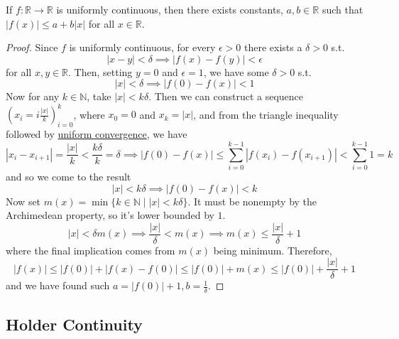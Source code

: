   \begin{theorem}
    \label{thm:uniformly-continuous-function-is-linearly}
    If $f: \mathbb{R} \to \mathbb{R}$ is uniformly continuous, then there exists constants, $a, b \in \mathbb{R}$ such that $|f(x)| \leq a + b|x|$ for all $x \in \mathbb{R}$. 
  \end{theorem}
  \begin{proof}
    Since $f$ is uniformly continuous, for every $\epsilon > 0$ there exists a $\delta > 0$ s.t. 
    \begin{equation}
      |x - y| < \delta \implies |f(x) - f(y)| < \epsilon
    \end{equation}
    for all $x, y \in \mathbb{R}$. Then, setting $y = 0$ and $\epsilon = 1$, we have some $\delta > 0$ s.t. 
    \begin{equation}
      |x| < \delta \implies |f(0) - f(x)| < 1
    \end{equation}
    Now for any $k \in \mathbb{N}$, take $|x| < k \delta$. Then we can construct a sequence $(x_i = i \frac{|x|}{k})_{i = 0}^{k}$, where $x_0 = 0$ and $x_k = |x|$, and from the triangle inequality followed by \hyperref[pst-def:uniform-convergence]{uniform convergence}, we have 
    \begin{equation}
      |x_i - x_{i+1}| = \frac{|x|}{k} < \frac{k\delta}{k} = \delta \implies |f(0) - f(x)| \leq \sum_{i=0}^{k - 1} |f(x_i) - f(x_{i+1})| < \sum_{i=0}^{k-1} 1 = k
    \end{equation} 
    and so we come to the result 
    \begin{equation}
      |x| < k \delta \implies |f(0) - f(x)| < k
    \end{equation}
    Now set $m(x) = \min \{ k \in \mathbb{N} \mid |x| < k \delta \}$. It must be nonempty by the Archimedean property, so it's lower bounded by $1$. 
    \begin{equation}
      |x| < \delta m(x) \implies \frac{|x|}{\delta} < m(x) \implies m(x) \leq \frac{|x|}{\delta} + 1
    \end{equation}
    where the final implication comes from $m(x)$ being minimum. Therefore, 
    \begin{equation}
      |f(x)| \leq |f(0)| + |f(x) - f(0)| \leq |f(0)| + m(x) \leq |f(0)| + \frac{|x|}{\delta} + 1
    \end{equation} 
    and we have found such $a = |f(0)| + 1, b = \frac{1}{\delta}$. 
  \end{proof}

\subsection{Holder Continuity}

